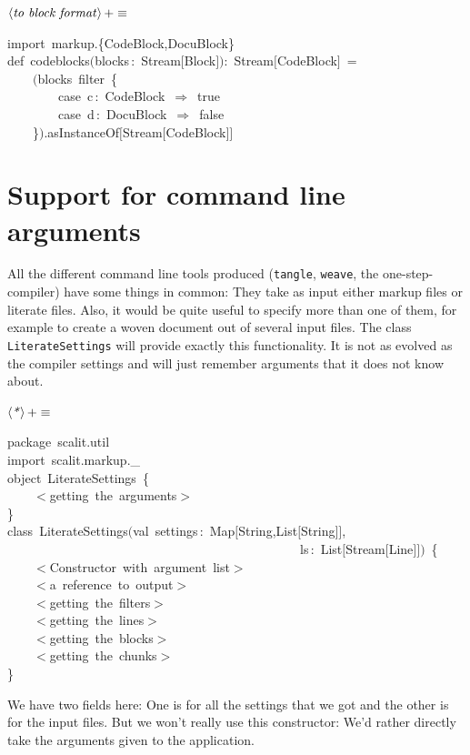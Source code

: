 \documentclass[a4paper,12pt]{article}
\begin{document}
$\left<\mbox{\emph{to block format}}\right>+\equiv$
\begin{program}{\vem import}~markup.{\small\{}CodeBlock,DocuBlock{\small\}}
\\{\vem def}~codeblocks$($blocks\,{\rm :}~Stream$[$Block$]$$)${\rm :}~Stream$[$CodeBlock$]$~=
\\~~~~$($blocks~filter~{\small\{}
\\~~~~~~~~{\vem case}~c\,{\rm :}~CodeBlock~$\Rightarrow$~{\vem true}
\\~~~~~~~~{\vem case}~d\,{\rm :}~DocuBlock~$\Rightarrow$~{\vem false}
\\~~~~{\small\}}$)$.asInstanceOf$[$Stream$[$CodeBlock$]$$]$
\end{program}
\section{Support for command line arguments}
All the different command line tools produced (\texttt{tangle}, \texttt{weave},
the one-step-compiler) have some things in common: They take as input
either markup files or literate files. Also, it would be quite useful to
specify more than one of them, for example to create a woven document out of
several input files. The class \texttt{LiterateSettings} will provide exactly this
functionality. It is not as evolved as the compiler settings and will just
remember arguments that it does not know about.

$\left<\mbox{\emph{*}}\right>+\equiv$
\begin{program}{\vem package}~scalit.util
\\{\vem import}~scalit.markup.\_
\\[0.5em]{\vem object}~LiterateSettings~{\small\{}
\\~~~~$<$getting~the~arguments$>$
\\{\small\}}
\\[0.5em]{\vem class}~LiterateSettings$(${\vem val}~settings\,{\rm :}~Map$[$String,List$[$String$]$$]$,
\\~~~~~~~~~~~~~~~~~~~~~~~~~~~~~~~~~~~~~~~~~~~~~~ls\,{\rm :}~List$[$Stream$[$Line$]$$]$$)$~{\small\{}
\\~~~~$<$Constructor~{\vem with}~argument~list$>$
\\[0.5em]~~~~$<$a~reference~to~output$>$
\\~~~~$<$getting~the~filters$>$
\\~~~~$<$getting~the~lines$>$
\\~~~~$<$getting~the~blocks$>$
\\~~~~$<$getting~the~chunks$>$
\\{\small\}}
\\[0.5em]\end{program}
We have two fields here: One is for all the settings that we got and
the other is for the input files. But we won't really use this constructor:
We'd rather directly take the arguments given to the application.
\end{document}
